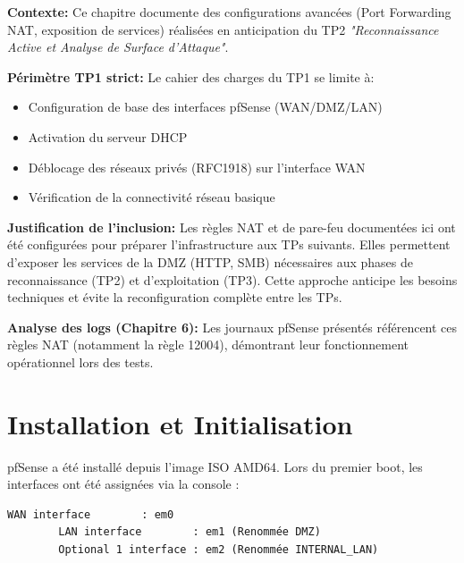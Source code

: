\documentclass[12pt,a4paper,openany]{report}
\begin{document}
	\begin{tcolorbox}[colback=secondary!10!white, colframe=secondary, 
		title=\textbf{Note sur le Périmètre du TP1}]
		\textbf{Contexte:} Ce chapitre documente des configurations avancées 
		(Port Forwarding NAT, exposition de services) réalisées en anticipation 
		du TP2 \textit{"Reconnaissance Active et Analyse de Surface d'Attaque"}.
		
		\textbf{Périmètre TP1 strict:} Le cahier des charges du TP1 se limite à:
		\begin{itemize}[nosep]
			\item Configuration de base des interfaces pfSense (WAN/DMZ/LAN)
			\item Activation du serveur DHCP
			\item Déblocage des réseaux privés (RFC1918) sur l'interface WAN
			\item Vérification de la connectivité réseau basique
		\end{itemize}
		
		\textbf{Justification de l'inclusion:} Les règles NAT et de pare-feu 
		documentées ici ont été configurées pour préparer l'infrastructure 
		aux TPs suivants. Elles permettent d'exposer les services de la DMZ 
		(HTTP, SMB) nécessaires aux phases de reconnaissance (TP2) et 
		d'exploitation (TP3). Cette approche anticipe les besoins techniques 
		et évite la reconfiguration complète entre les TPs.
		
		\textbf{Analyse des logs (Chapitre 6):} Les journaux pfSense présentés 
		référencent ces règles NAT (notamment la règle 12004), démontrant 
		leur fonctionnement opérationnel lors des tests.
	\end{tcolorbox}
	
	\vspace{0.5cm}
	
	
	\section{Installation et Initialisation}
	pfSense a été installé depuis l'image ISO AMD64. Lors du premier boot, les interfaces ont été assignées via la console :
	\begin{lstlisting}[caption=Assignation des Interfaces en Console]
		WAN interface        : em0
		LAN interface        : em1 (Renommée DMZ)
		Optional 1 interface : em2 (Renommée INTERNAL_LAN)
	\end{lstlisting}
	
\end{document}
